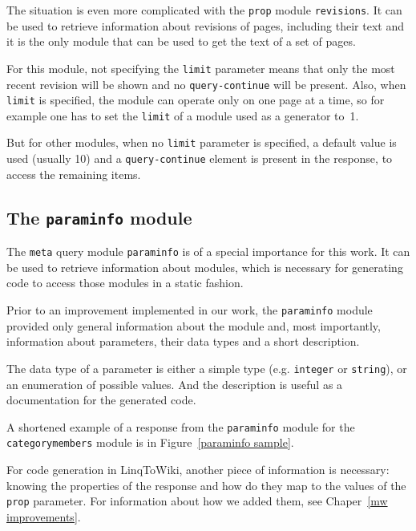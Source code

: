 The situation is even more complicated with the \texttt{prop} module \texttt{revisions}.
It can be used to retrieve information about revisions of pages, including their text
and it is the only module that can be used to get the text of a set of pages.

For this module, not specifying the \texttt{limit} parameter means that only the most
recent revision will be shown and no \texttt{query-continue} will be present.
Also, when \texttt{limit} is specified, the module can operate only on one page at a time,
so for example one has to set the \texttt{limit} of a module used as a generator to~1.

But for other modules, when no \texttt{limit} parameter is specified, a default value is used (usually 10)
and a \texttt{query-continue} element is present in the response, to access the remaining items.

\subsection{The \texttt{paraminfo} module}
\label{paraminfo}

The \texttt{meta} query module \texttt{paraminfo} is of a special importance for this work.
It can be used to retrieve information about modules,
which is necessary for generating code to access those modules in a static fashion.

Prior to an improvement implemented in our work,
the \texttt{paraminfo} module provided only general information about the module
and, most importantly, information about parameters, their data types and a short description.

The data type of a parameter is either a simple type (e.g. \texttt{integer} or \texttt{string}),
or an enumeration of possible values.
And the description is useful as a documentation for the generated code.

A shortened example of a response from the \texttt{paraminfo} module
for the \texttt{categorymembers} module is in Figure~\ref{paraminfo sample}.

For code generation in LinqToWiki, another piece of information is necessary:
knowing the properties of the response and how do they map to the values of the \texttt{prop} parameter.
For information about how we added them, see Chaper~\ref{mw improvements}.

